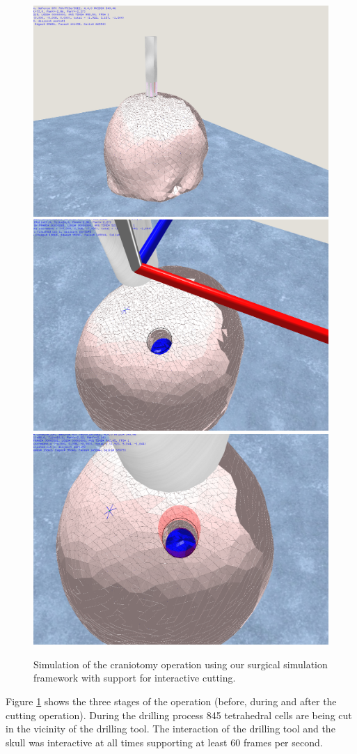 \begin{figure}[H]
  \centering
  \includegraphics[width=0.5\linewidth]{figures/evaluation/craniotomy06.png}
  \includegraphics[width=0.5\linewidth]{figures/evaluation/craniotomy07.png}
  \includegraphics[width=0.5\linewidth]{figures/evaluation/craniotomy08.png}
  \caption{\label{fig:craniotomy}
  {Simulation of the craniotomy operation using our surgical simulation framework with support for interactive cutting.}
}
\end{figure}

Figure \ref{fig:craniotomy} shows the three stages of the operation (before, during and after the cutting operation). 
During the drilling process 845 tetrahedral cells are being cut in the vicinity of the drilling tool. The interaction of the drilling tool and the skull 
was interactive at all times supporting at least 60 frames per second.